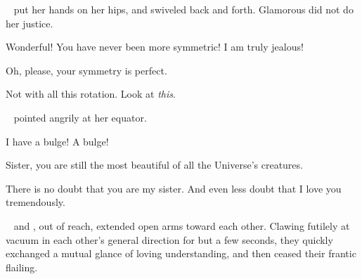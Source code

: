\documentclass[main.tex]{subfiles}
\begin{document}
\par \nar \rmmaia~ put her hands on her hips, and swiveled back and forth.  Glamorous did not do her justice.

\par \Merope Wonderful!  You have never been more symmetric!  I am truly jealous!

\par \Maia Oh, please, your symmetry is perfect.  

\par \Merope Not with all this rotation.  Look at \textit{this}.

\par \nar \rmmerope~ pointed angrily at her equator. 

\par \Merope I have a bulge!  A bulge!

\par \Maia Sister, you are still the most beautiful of all the Universe's creatures.

\par \Merope There is no doubt that you are my sister.  And even less doubt that I love you tremendously.

\par \nar \rmmaia~ and \rmmerope, out of reach, extended open arms toward each other.  Clawing futilely at vacuum in each other's general direction for but a few seconds, they quickly exchanged a mutual glance of loving understanding, and then ceased their frantic flailing.
\end{document}
